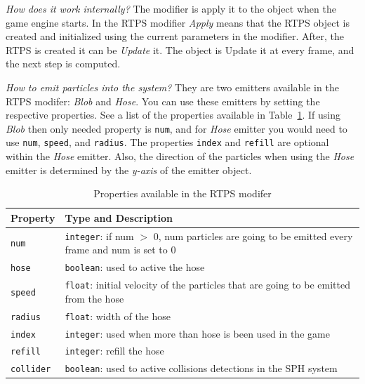 \textit{How does it work internally?} The modifier is apply it to the object when the game engine starts. In the RTPS modifier \textit{Apply} means that the RTPS object is created and initialized using the current parameters in the modifier. After, the RTPS is created it can be \textit{Update} it. The object is Update it at every frame, and the next step is computed.    

\textit{How to emit particles into the system?} They are two emitters available in the RTPS modifer: \textit{Blob} and \textit{Hose}. You can use these emitters by setting the respective properties. See a list of the properties available in Table~\ref{properties}. If using \textit{Blob} then only needed property is \texttt{num}, and for \textit{Hose} emitter you would need to use \texttt{num}, \texttt{speed}, and \texttt{radius}. The properties \texttt{index} and \texttt{refill} are optional within the \textit{Hose} emitter. Also, the direction of the particles when using the \textit{Hose} emitter is determined by the \textit{y-axis} of the emitter object. 

\begin{table}[htdp]
\caption{Properties available in the RTPS modifer}
\begin{center}
\begin{tabular}{|p{3cm}|p{9cm}|}
\hline 
\textbf{Property} & \textbf{Type and Description} \\\hline 
\texttt{num} 	& \texttt{integer}: if num $>$ 0, num particles are going to be emitted every frame and num is set to 0	\\\hline 
\texttt{hose}	& \texttt{boolean}: used to active the hose	\\\hline
\texttt{speed}	& \texttt{float}: initial velocity of the particles that are going to be emitted from the hose	\\\hline
\texttt{radius}	& \texttt{float}: width of the hose	\\\hline
\texttt{index}	& \texttt{integer}: used when more than hose is been used in the game	\\\hline
\texttt{refill}	& \texttt{integer}: 	refill the hose \\\hline
\texttt{collider}	& \texttt{boolean}: used to active collisions detections in the SPH system	\\
\hline 
\end{tabular}
\end{center}
\label{properties}
\end{table}

